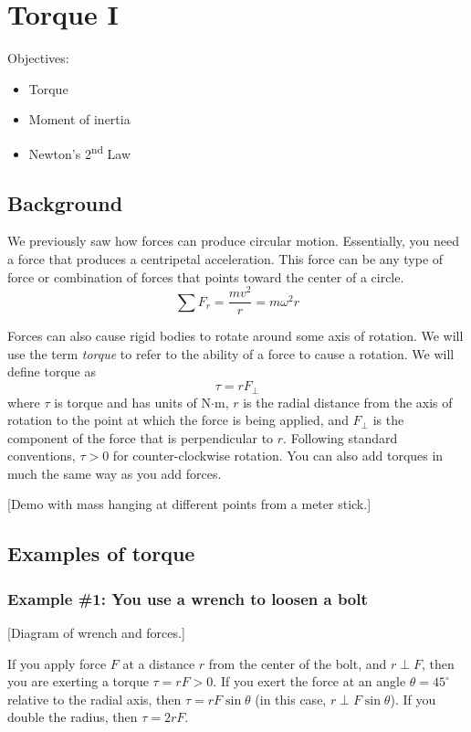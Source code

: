 \section{Torque I}
Objectives:
\begin{itemize}
\item Torque
\item Moment of inertia
\item Newton's 2\textsuperscript{nd} Law
\end{itemize}

\subsection{Background}
We previously saw how forces can produce circular motion. Essentially, you need a force that produces a centripetal acceleration. This force can be any type of force or combination of forces that points toward the center of a circle.
$$\sum F_r=\frac{mv^2}{r}=m\omega^2r$$

Forces can also cause rigid bodies to rotate around some axis of rotation. We will use the term \textit{torque} to refer to the ability of a force to cause a rotation. We will define torque as
$$\boxed{\tau=rF_\perp}$$
where $\tau$ is torque and has units of N$\cdot$m, $r$ is the radial distance from the axis of rotation to the point at which the force is being applied, and $F_\perp$ is the component of the force that is perpendicular to $r$. Following standard conventions, $\tau>0$ for counter-clockwise rotation. You can also add torques in much the same way as you add forces. %

[Demo with mass hanging at different points from a meter stick.]

\subsection{Examples of torque}
\subsubsection*{Example \#1: You use a wrench to loosen a bolt} 
[Diagram of wrench and forces.]
\vspace{5cm}

If you apply force $F$ at a distance $r$ from the center of the bolt, and $r\perp F$, then you are exerting a torque $\tau=rF>0$.  If you exert the force at an angle $\theta=45^\circ$ relative to the radial axis, then $\tau=rF\sin\theta$ (in this case, $r\perp F\sin\theta$). If you double the radius, then $\tau=2rF$.

